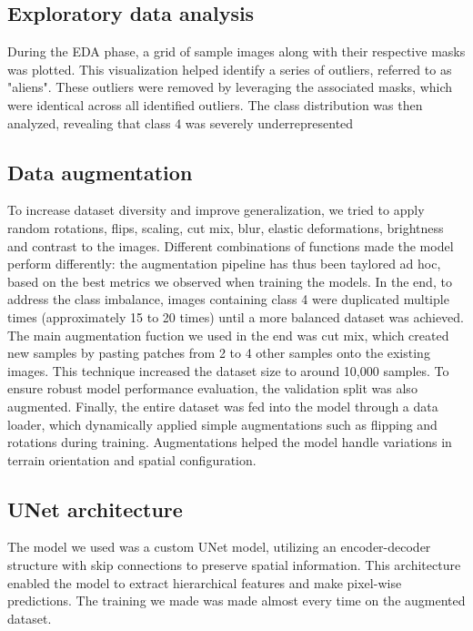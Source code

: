 \documentclass[11pt]{article}
\begin{document}
\begin{multicols}{2}
        \subsection{Exploratory data analysis}
        
        During the EDA phase, a grid of sample images along with their respective masks was plotted.
        This visualization helped identify a series of outliers, referred to as "aliens".
        These outliers were removed by leveraging the associated masks, which were identical across all identified outliers. 
        The class distribution was then analyzed, revealing that class 4 was severely underrepresented
        
        \subsection{Data augmentation}
        
        To increase dataset diversity and improve generalization, we tried to apply random rotations, flips, scaling, cut mix, blur, elastic deformations, brightness and contrast to the images. 
        Different combinations of functions made the model perform differently: the augmentation pipeline has thus been taylored ad hoc, based on the best metrics we observed when training the models.
        In the end, to address the class imbalance, images containing class 4 were duplicated multiple times (approximately 15 to 20 times) until a more balanced dataset was achieved.
        The main augmentation fuction we used in the end was cut mix, which created new samples by pasting patches from 2 to 4 other samples onto the existing images. 
        This technique increased the dataset size to around 10,000 samples.
        To ensure robust model performance evaluation, the validation split was also augmented.
        Finally, the entire dataset was fed into the model through a data loader, which dynamically applied simple augmentations such as flipping and rotations during training.
        Augmentations helped the model handle variations in terrain orientation and spatial configuration.
        
        \subsection{UNet architecture}
        
        The model we used was a custom UNet model, utilizing an encoder-decoder structure with skip connections to preserve spatial information. 
        This architecture enabled the model to extract hierarchical features and make pixel-wise predictions. 
        The training we made was made almost every time on the augmented dataset.


\end{multicols}
\end{document}
